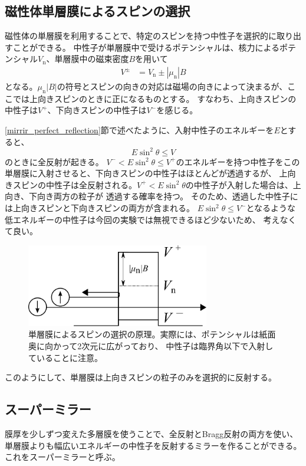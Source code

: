 \subsection{磁性体単層膜によるスピンの選択}
磁性体の単層膜を利用することで、特定のスピンを持つ中性子を選択的に取り出すことができる。
中性子が単層膜中で受けるポテンシャルは、核力によるポテンシャル$V_\mathrm{n}$、単層膜中の磁束密度$B$を用いて
\begin{align}
V^{\pm}&=V_\mathrm{n}\pm|\mu_\mathrm{n}|B
\end{align}
となる。$\mu_\mathrm{n}|B|$の符号とスピンの向きの対応は磁場の向きによって決まるが、ここでは上向きスピンのときに正になるものとする。
すなわち、上向きスピンの中性子は$V^+$、下向きスピンの中性子は$V^-$を感じる。

\ref{mirrir_perfect_reflection}節で述べたように、入射中性子のエネルギーを$E$とすると、
\[
E\sin^2\theta\leq V
\]
のときに全反射が起きる。
$V^-< E\sin^2\theta\leq V^+$のエネルギーを持つ中性子をこの単層膜に入射させると、下向きスピンの中性子はほとんどが透過するが、
上向きスピンの中性子は全反射される。$V^+<E\sin^2\theta$の中性子が入射した場合は、上向き、下向き両方の粒子が
透過する確率を持つ。
そのため、透過した中性子には上向きスピンと下向きスピンの両方が含まれる。
$E\sin^2\theta\leq V^-$となるような低エネルギーの中性子は今回の実験では無視できるほど少ないため、
考えなくて良い。
\begin{figure}[h]
\centering
\includegraphics[width=8cm]{mirror/mono_mirror.pdf}
\caption{単層膜によるスピンの選択の原理。実際には、ポテンシャルは紙面奥に向かって2次元に広がっており、
中性子は臨界角以下で入射していることに注意。}
\end{figure}
このようにして、単層膜は上向きスピンの粒子のみを選択的に反射する。


\subsection{スーパーミラー}
膜厚を少しずつ変えた多層膜を使うことで、全反射とBragg反射の両方を使い、
単層膜よりも幅広いエネルギーの中性子を反射するミラーを作ることができる。
これをスーパーミラーと呼ぶ。

